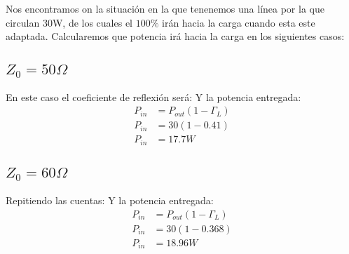 
Nos encontramos on la situación en la que tenenemos una línea por la que circulan 30W, de los cuales el $100\%$ irán hacia la carga cuando esta este adaptada. Calcularemos que potencia irá hacia la carga en los siguientes casos:
\subsection{$Z_0 = 50\Omega$}
En este caso el coeficiente de reflexión será:
Y la potencia entregada:
\begin{align*}
  P_{in} &= P_{out}(1- \Gamma_L) \\
  P_{in} &= 30(1- 0.41) \\
  P_{in} &= 17.7 W
\end{align*}
\subsection{$Z_0 = 60\Omega$}
Repitiendo las cuentas:
Y la potencia entregada:
\begin{align*}
  P_{in} &= P_{out}(1- \Gamma_L) \\
  P_{in} &= 30(1- 0.368) \\
  P_{in} &= 18.96 W
\end{align*}
